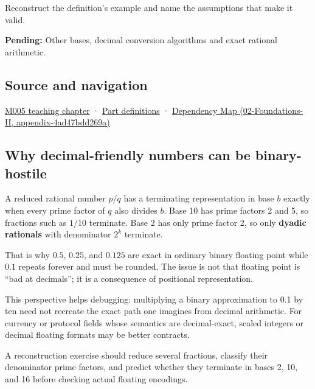 Reconstruct the definition's example and name the assumptions that make it valid.

\textbf{Pending:} Other bases, decimal conversion algorithms and exact rational arithmetic.

\subsection{Source and navigation}\label{appendix-2a2f1b74bdd3-source-and-navigation}

\hyperref[01-foundations-i-ch001-when-arithmetic-meets-uncertainty]{M005 teaching chapter} · \hyperref[appendix-fd090d982a15-m005---parts-77-88]{Part definitions} · \href{../02-Foundations-II/main.pdf\#nameddest=appendix-4ad47bdd269a}{Dependency Map (02-Foundations-II, appendix-4ad47bdd269a)}

\subsection{Why decimal-friendly numbers can be binary-hostile}\label{appendix-2a2f1b74bdd3-why-decimal-friendly-numbers-can-be-binary-hostile}

A reduced rational number \(p/q\) has a terminating representation in base \(b\) exactly when every prime factor of \(q\) also divides \(b\). Base 10 has prime factors 2 and 5, so fractions such as \(1/10\) terminate. Base 2 has only prime factor 2, so only \textbf{dyadic rationals} with denominator \(2^k\) terminate.

That is why \(0.5\), \(0.25\), and \(0.125\) are exact in ordinary binary floating point while \(0.1\) repeats forever and must be rounded. The issue is not that floating point is ``bad at decimals''; it is a consequence of positional representation.

This perspective helps debugging: multiplying a binary approximation to 0.1 by ten need not recreate the exact path one imagines from decimal arithmetic. For currency or protocol fields whose semantics are decimal-exact, scaled integers or decimal floating formats may be better contracts.

A reconstruction exercise should reduce several fractions, classify their denominator prime factors, and predict whether they terminate in bases 2, 10, and 16 before checking actual floating encodings.
